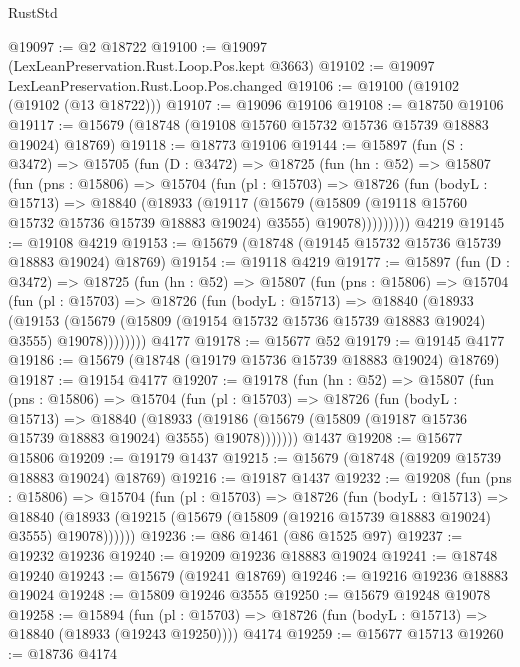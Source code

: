 \begin{lexlean}{RustStd}
\begin{coremodule}
@19097 := @2 @18722
@19100 := @19097 (LexLeanPreservation.Rust.Loop.Pos.kept @3663)
@19102 := @19097 LexLeanPreservation.Rust.Loop.Pos.changed
@19106 := @19100 (@19102 (@19102 (@13 @18722)))
@19107 := @19096 @19106
@19108 := @18750 @19106
@19117 := @15679 (@18748 (@19108 @15760 @15732 @15736 @15739 @18883 @19024) @18769)
@19118 := @18773 @19106
@19144 := @15897
    (fun (S : @3472) =>
    @15705
      (fun (D : @3472) =>
      @18725
        (fun (hn : @52) =>
        @15807
          (fun (pns : @15806) =>
          @15704
            (fun (pl : @15703) =>
            @18726
              (fun (bodyL : @15713) =>
              @18840
                (@18933
                  (@19117
                    (@15679
                      (@15809 (@19118 @15760 @15732 @15736 @15739 @18883 @19024) @3555)
                      @19078)))))))))
    @4219
@19145 := @19108 @4219
@19153 := @15679 (@18748 (@19145 @15732 @15736 @15739 @18883 @19024) @18769)
@19154 := @19118 @4219
@19177 := @15897
    (fun (D : @3472) =>
    @18725
      (fun (hn : @52) =>
      @15807
        (fun (pns : @15806) =>
        @15704
          (fun (pl : @15703) =>
          @18726
            (fun (bodyL : @15713) =>
            @18840
              (@18933
                (@19153
                  (@15679 (@15809 (@19154 @15732 @15736 @15739 @18883 @19024) @3555) @19078))))))))
    @4177
@19178 := @15677 @52
@19179 := @19145 @4177
@19186 := @15679 (@18748 (@19179 @15736 @15739 @18883 @19024) @18769)
@19187 := @19154 @4177
@19207 := @19178
    (fun (hn : @52) =>
    @15807
      (fun (pns : @15806) =>
      @15704
        (fun (pl : @15703) =>
        @18726
          (fun (bodyL : @15713) =>
          @18840
            (@18933
              (@19186 (@15679 (@15809 (@19187 @15736 @15739 @18883 @19024) @3555) @19078)))))))
    @1437
@19208 := @15677 @15806
@19209 := @19179 @1437
@19215 := @15679 (@18748 (@19209 @15739 @18883 @19024) @18769)
@19216 := @19187 @1437
@19232 := @19208
    (fun (pns : @15806) =>
    @15704
      (fun (pl : @15703) =>
      @18726
        (fun (bodyL : @15713) =>
        @18840 (@18933 (@19215 (@15679 (@15809 (@19216 @15739 @18883 @19024) @3555) @19078))))))
@19236 := @86 @1461 (@86 @1525 @97)
@19237 := @19232 @19236
@19240 := @19209 @19236 @18883 @19024
@19241 := @18748 @19240
@19243 := @15679 (@19241 @18769)
@19246 := @19216 @19236 @18883 @19024
@19248 := @15809 @19246 @3555
@19250 := @15679 @19248 @19078
@19258 := @15894
    (fun (pl : @15703) => @18726 (fun (bodyL : @15713) => @18840 (@18933 (@19243 @19250))))
    @4174
@19259 := @15677 @15713
@19260 := @18736 @4174

\end{coremodule}
\end{lexlean}
